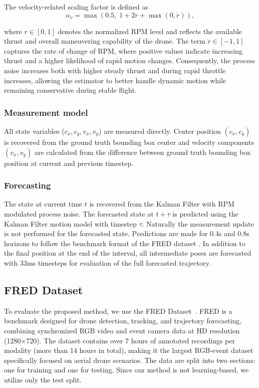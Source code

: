 \documentclass[letterpaper, 10 pt, conference]{ieeeconf}  %
\begin{document}
The velocity-related scaling factor is defined as
\begin{equation*}
\alpha_v = \max\!\left(0.5,\; 1 + 2r + \max(0,\dot r)\right),
\end{equation*}

where $r \in [0,1]$ denotes the normalized RPM level and reflects the available thrust and overall maneuvering capability of the drone. 
The term $\dot r \in [-1,1]$ captures the rate of change of RPM, where positive values indicate increasing thrust and a higher likelihood of rapid motion changes. 
Consequently, the process noise increases both with higher steady thrust and during rapid throttle increases, allowing the estimator to better handle dynamic motion while remaining conservative during stable flight.


\subsubsection{Measurement model}

All state variables ($c_x, c_y, v_x,v_y$) are measured directly. Center position $(c_x,c_y)$ is recovered from the ground truth bounding box center and velocity components $(v_x,v_y)$ are calculated from the difference between ground truth bounding box position at current and previous timestep.  

\subsubsection{Forecasting}
The state at current time $t$ is recovered from the Kalman Filter with RPM modulated process noise. The forecasted state at $t+ \tau$ is predicted using the Kalman Filter motion model with timestep $\tau$. Naturally the measurement update is not performed for the forecasted state. Predictions are made for 0.4s and 0.8s horizons to follow the benchmark format of the FRED dataset \cite{magrini_fred_2025}. In addition to the final position at the end of the interval, all intermediate poses are forecasted with 33ms timesteps for evaluation of the full forecasted trajectory. 

\subsection{FRED Dataset}\label{subsec:fred_dataset}

To evaluate the proposed method, we use the FRED Dataset~\cite{magrini_fred_2025}.
FRED is a benchmark designed for drone detection, tracking, and trajectory forecasting, combining synchronized RGB video and event camera data at HD resolution (1280$\times$720).
The dataset contains over 7 hours of annotated recordings per modality (more than 14 hours in total), making it the largest RGB-event dataset specifically focused on aerial drone scenarios.
The data are split into two sections: one for training and one for testing. Since our method is not learning-based, we utilize only the test split.
\end{document}
